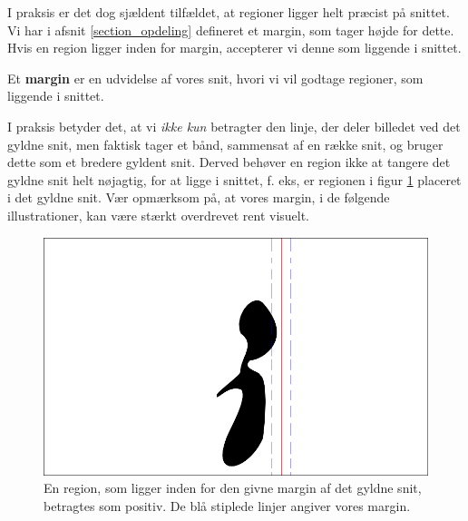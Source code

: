 {%
I praksis er det dog sjældent tilfældet, at regioner ligger helt præcist
på snittet. Vi har i afsnit \ref{section_opdeling} defineret et margin,
som tager højde for dette. Hvis en region ligger inden for margin,
accepterer vi denne som liggende i snittet.
\begin{definition}
    Et \textbf{margin} er en udvidelse af vores snit, hvori vi vil
    godtage regioner, som liggende i snittet.
    \label{def_margin}
\end{definition}
I praksis betyder det, at vi \emph{ikke kun} betragter den linje, der
deler billedet ved det gyldne snit, men faktisk tager et bånd, sammensat
af en række snit, og bruger dette som et bredere gyldent snit.  Derved
behøver en region ikke at tangere det gyldne snit helt nøjagtig, for at
ligge i snittet, f. eks, er regionen i figur \ref{pos_naiv_margin_1}
placeret i det gyldne snit.  Vær opmærksom på, at vores margin, i de
følgende illustrationer, kan være stærkt overdrevet rent visuelt.
\begin{figure}[hb]
    \centering
    \includegraphics[scale=\imgscale,angle=0]{afsnit/vores_implementation/billeder/naiv_algoritme/naiv_positiv_blob_margin_1}
    \caption[Positiv region i margen]{En region, som ligger inden for
    den givne margin af det gyldne snit, betragtes som positiv. De blå
    stiplede linjer angiver vores margin.}
    \label{pos_naiv_margin_1}
\end{figure}

}
